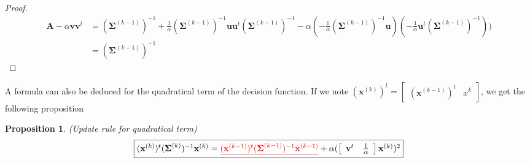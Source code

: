 \documentclass[a4paper,11pt,DIV=16,abstracton]{scrartcl}
\newcommand*{\equl}[2]{%
    \textcolor{#1}{\underline{#2}}%
}
\newtheorem{prop}{Proposition}
\begin{document}
        \begin{proof}
            \begin{align*}
                \mathbf{A} - \alpha \mathbf{v} \mathbf{v}^t
                &= (\boldsymbol{\Sigma}^{(k-1)})^{-1} + \frac{1}{\alpha} (\boldsymbol{\Sigma}^{(k-1)})^{-1} \mathbf{u} \mathbf{u}^t (\boldsymbol{\Sigma}^{(k-1)})^{-1} - \alpha (- \frac{1}{\alpha} (\boldsymbol{\Sigma}^{(k-1)})^{-1} \mathbf{u}) (- \frac{1}{\alpha} \mathbf{u}^t (\boldsymbol{\Sigma}^{(k-1)})^{-1})) \\
                &= (\boldsymbol{\Sigma}^{(k-1)})^{-1}
            \end{align*}
        \end{proof}

        A formula can also be deduced for the quadratical term of the decision function. If we note $(\mathbf{x}^{(k)})^t = \left[\begin{array}{cc} (\mathbf{x}^{(k-1)})^t   & x^k \end{array}\right]$, we get the following proposition
        \begin{prop}
        \label{eq:update-quad}
            (Update rule for quadratical term)
            \begin{equation*}
                \fbox{$(\mathbf{x}^{(k)})^t (\boldsymbol{\Sigma}^{(k)})^{-1} \mathbf{x}^{(k)} = \equl{red}{(\mathbf{x}^{(k-1)})^t (\boldsymbol{\Sigma}^{(k-1)})^{-1} \mathbf{x}^{(k-1)}} + \alpha ( \left[\begin{array}{cc} \mathbf{v}^t & \frac{1}{\alpha} \end{array}\right] \mathbf{x}^{(k)} )^2$}
            \end{equation*}
        \end{prop}
\end{document}
